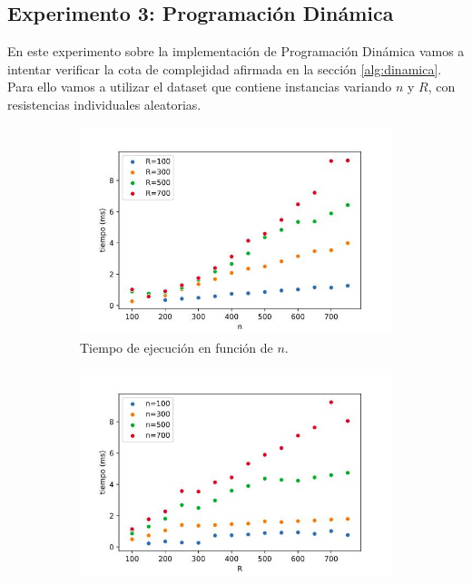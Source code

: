 \documentclass[10pt,a4paper]{article}
\begin{document}
\subsection{Experimento 3: Programación Dinámica}
En este experimento sobre la implementación de Programación Dinámica vamos a intentar verificar la cota de complejidad afirmada en la sección \ref{alg:dinamica}. Para ello vamos a utilizar el dataset que contiene instancias variando $n$ y $R$, con resistencias individuales aleatorias.
\newline
\begin{figure}[h!]
	\centering
	\begin{subfigure}{0.45\linewidth}
		\centering
		\includegraphics[scale=0.30]{img/dp-n.jpg}
		\caption{Tiempo de ejecución en función de $n$.}
		\label{fig:dp-n}
	\end{subfigure}
	\begin{subfigure}{0.45\linewidth}
		\centering
		\includegraphics[scale=0.30]{img/dp-R.jpg}

\end{subfigure}
\end{figure}
\end{document}
